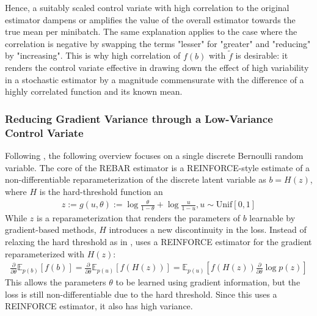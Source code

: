 \documentclass{article}
\begin{document}
Hence, a suitably scaled control variate with high correlation to the original estimator dampens or amplifies the value of the overall estimator towards the true mean per minibatch.
The same explanation applies to the case where the correlation is negative by swapping the terms "lesser" for "greater" and "reducing" by "increasing".
This is why high correlation of $f(b)$ with $\tilde{f}$ is desirable: it renders the control variate effective in drawing down the effect of high variability in a stochastic estimator by a magnitude commensurate with the difference of a highly correlated function and its known mean.

\subsubsection{Reducing Gradient Variance through a Low-Variance Control Variate}
Following \cite{tucker2017rebar}, the following overview focuses on a single discrete Bernoulli random variable.
The core of the REBAR estimator is a REINFORCE-style estimate of a non-differentiable reparameterization of the discrete latent variable as $b=H(z)$, where $H$ is the hard-threshold function an
\begin{align}
z := g(u, \theta) := \log\frac{\theta}{1-\theta} + \log\frac{u}{1-u}, u \sim \text{Unif}[0,1]
\end{align}
While $z$ is a reparameterization that renders the parameters of $b$ learnable by gradient-based methods, $H$ introduces a new discontinuity in the loss.
Instead of relaxing the hard threshold as in \cite{maddison2016concrete}, \cite{tucker2017rebar} uses a REINFORCE estimator for the gradient reparameterized with $H(z)$:
\begin{align}
    \frac{\partial}{\partial \theta} \mathbb{E}_{p(b)}[f(b)] = \frac{\partial}{\partial \theta} \mathbb{E}_{p(u)}[f(H(z))] = \mathbb{E}_{p(u)}[f(H(z))\frac{\partial}{\partial \theta}\log p(z)]
\end{align}
This allows the parameters $\theta$ to be learned using gradient information, but the loss is still non-differentiable due to the hard threshold.
Since this uses a REINFORCE estimator, it also has high variance.
\end{document}
